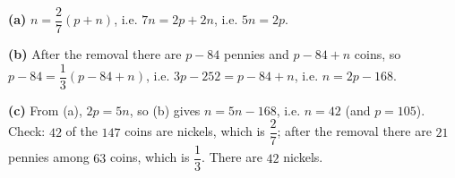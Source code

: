 \textbf{(a)} $n=\dfrac27(p+n)$, i.e. $7n=2p+2n$, i.e. $5n=2p$.

\textbf{(b)} After the removal there are $p-84$ pennies and $p-84+n$ coins, so $p-84=\dfrac13(p-84+n)$, i.e. $3p-252=p-84+n$, i.e. $n=2p-168$.

\textbf{(c)} From (a), $2p=5n$, so (b) gives $n=5n-168$, i.e. $n=42$ (and $p=105$). Check: $42$ of the $147$ coins are nickels, which is $\dfrac27$; after the removal there are $21$ pennies among $63$ coins, which is $\dfrac13$. There are $\boxed{42}$ nickels.
